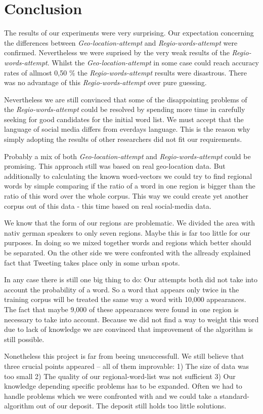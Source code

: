\documentclass[./Main.tex]{subfiles}
\begin{document}
\section{Conclusion}
The results of our experiments were very surprising. Our expectation concerning the differences between \emph{Geo-location-attempt} and \emph{Regio-words-attempt} were confirmed. Nevertheless we were suprised by the very weak results of the \emph{Regio-words-attempt}. Whilst the \emph{Geo-location-attempt} in some case could reach accuracy rates of allmost 0,50 \% the \emph{Regio-words-attempt} results were disastrous. There was no advantage of this \emph{Regio-words-attempt} over pure guessing.

Nevertheless we are still convinced that some of the disappointing problems of the \emph{Regio-words-attempt} could be resolved by spending more time in carefully seeking for good candidates for the initial word list. We must accept that the language of social media differs from everdays language. This is the reason why simply adopting the results of other researchers did not fit our requirements.

Probably a mix of both \emph{Geo-location-attempt} and \emph{Regio-words-attempt} could be promising. This approach still was based on real geo-location data. But additionally to calculating the known word-vectors we could try to find regional words by simple comparing if the ratio of a word in one region is bigger than the ratio of this word over the whole corpus. This way we could create yet another corpus out of this data - this time based on real social-media data.

We know that the form of our regions are problematic. We divided the area with nativ german speakers to only seven regions. Maybe this is far too little for our purposes. In doing so we mixed together words and regions which better should be separated. On the other side we were confronted with the allready explained fact that Tweeting takes place only in some urban spots.

In any case there is still one big thing to do: Our attempts both did not take into account the probability of a word. So a word that appears only twice in the training corpus will be treated the same way a word with 10,000 appearances. The fact that maybe 9,000 of these appearances were found in one region is necessary to take into account.  Because we did not find a way to weight this word due to lack of knowledge we are convinced that improvement of the algorithm is still possible.

Nonetheless this project is far from beeing unsuccessfull. We still believe that three crucial points appeared -- all of them improvable: 1) The size of data was too small 2) The quality of our regional-word-list was not sufficient 3) Our knowledge depending specific problems has to be expanded. Often we had to handle problems which we were confronted with and we could take a standard-algorithm out of our deposit. The deposit still holds too little solutions. 
\end{document}
